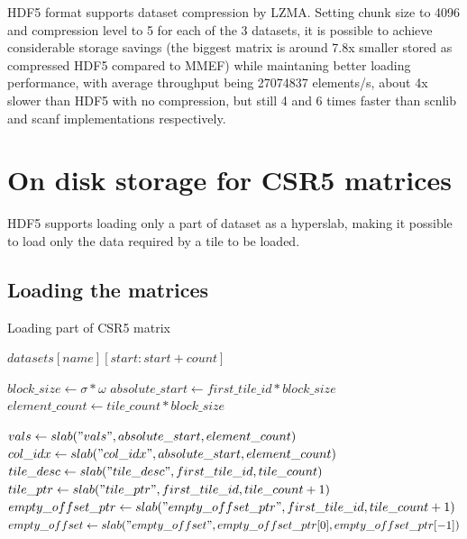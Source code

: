 \documentclass[thesis=M,english]{FITthesis}[2019/12/23]
\begin{document}
HDF5 format supports dataset compression by LZMA. Setting chunk size to 4096 and compression level to 5 for each of the 3 datasets,
it is possible to achieve considerable storage savings (the biggest matrix is around 7.8x smaller stored as compressed HDF5 compared to MMEF)
while maintaning better loading performance, with average throughput being 27074837 elements/s, about 4x slower than HDF5 with no compression,
but still 4 and 6 times faster than scnlib and scanf implementations respectively.




\chapter{On disk storage for CSR5 matrices}

HDF5 supports loading only a part of dataset as a hyperslab, making it possible to load only the data
required by a tile to be loaded.



\section{Loading the matrices}


\begin{algorithm}
    \caption{Loading part of CSR5 matrix}
    \begin{algorithmic}

        \Return $datasets[name][start:start + count]$
        \EndFunction

        \State $block\_size \gets \sigma*\omega$
        \State $absolute\_start \gets first\_tile\_id * block\_size$
        \State $element\_count \gets tile\_count * block\_size$

        \State $vals \gets slab("vals", absolute\_start, element\_count)$
        \State $col\_idx \gets slab("col\_idx", absolute\_start, element\_count)$
        \State $tile\_desc \gets slab("tile\_desc", first\_tile\_id, tile\_count)$
        \State $tile\_ptr \gets slab("tile\_ptr", first\_tile\_id, tile\_count + 1)$
        \State $empty\_offset\_ptr \gets slab("empty\_offset\_ptr", first\_tile\_id, tile\_count + 1)$
        \State $empty\_offset \gets slab("empty\_offset", empty\_offset\_ptr[0], empty\_offset\_ptr[-1])$
        \EndFunction
    \end{algorithmic}
\end{algorithm}
\end{document}
